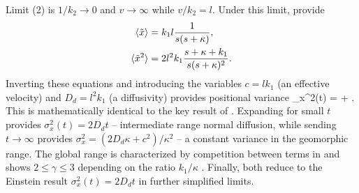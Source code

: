 Limit (2) is $1/k_2 \rightarrow 0$ and $v\rightarrow \infty$ while $v/k_2 = l$. Under this limit, \DIFdelbegin {}\DIFdelend \DIFaddbegin {}\DIFaddend provide
\begin{align}
	\langle \tilde{x} \rangle &= k_1l\frac{1}{s(s+\kappa)},\\
	\langle \tilde{x}^2 \rangle &= 2l^2k_1 \frac{s+\kappa+k_1}{s(s+\kappa)^2}.
\end{align}
Inverting these equations and introducing the variables $c=lk_1$ (an effective velocity) and $D_d = l^2k_1$ (a diffusivity) provides positional variance
\be \sigma_x^2(t) =  + . \label{eq:wuvar}\ee
This is mathematically identical to the key result of \citet{Wu2019}.
Expanding for small $t$ provides $\sigma_x^2(t) = 2D_d t$ -- intermediate range normal diffusion, while sending $t\rightarrow \infty$ provides $\sigma_x^2 = (2D_d\kappa + c^2)/\kappa^2$ -- a constant variance in the geomorphic range.
The global range is characterized by competition between terms in \DIFdelbegin {}\DIFdelend \DIFaddbegin {}\DIFaddend and shows $2 \leq \gamma \leq 3$ depending on the ratio $k_1/\kappa$ \DIFdelbegin {}\DIFdelend \DIFaddbegin {}\DIFaddend .
Finally, both \DIFdelbegin {}\DIFdelend \DIFaddbegin {}\DIFaddend reduce to the Einstein result $\sigma_x^2(t) = 2D_d t$ in further simplified limits.
